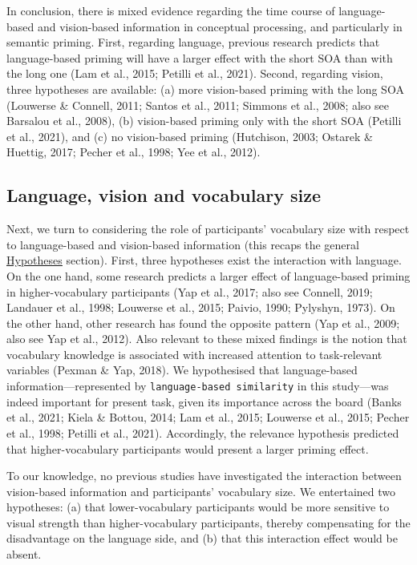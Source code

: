 \documentclass[
  12pt,
  man,floatsintext]{apa7}
\begin{document}
In conclusion, there is mixed evidence regarding the time course of language-based and vision-based information in conceptual processing, and particularly in semantic priming. First, regarding language, previous research predicts that language-based priming will have a larger effect with the short SOA than with the long one (Lam et al., 2015; Petilli et al., 2021). Second, regarding vision, three hypotheses are available: (a) more vision-based priming with the long SOA (Louwerse \& Connell, 2011; Santos et al., 2011; Simmons et al., 2008; also see Barsalou et al., 2008), (b) vision-based priming only with the short SOA (Petilli et al., 2021), and (c) no vision-based priming (Hutchison, 2003; Ostarek \& Huettig, 2017; Pecher et al., 1998; Yee et al., 2012).

\hypertarget{language-vision-and-vocabulary-size}{%
\subsection{Language, vision and vocabulary size}\label{language-vision-and-vocabulary-size}}

Next, we turn to considering the role of participants' vocabulary size with respect to language-based and vision-based information (this recaps the general \protect\hyperlink{hypotheses}{\underline{Hypotheses}} section). First, three hypotheses exist the interaction with language. On the one hand, some research predicts a larger effect of language-based priming in higher-vocabulary participants (Yap et al., 2017; also see Connell, 2019; Landauer et al., 1998; Louwerse et al., 2015; Paivio, 1990; Pylyshyn, 1973). On the other hand, other research has found the opposite pattern (Yap et al., 2009; also see Yap et al., 2012). Also relevant to these mixed findings is the notion that vocabulary knowledge is associated with increased attention to task-relevant variables (Pexman \& Yap, 2018). We hypothesised that language-based information---represented by \texttt{language-based\ similarity} in this study---was indeed important for present task, given its importance across the board (Banks et al., 2021; Kiela \& Bottou, 2014; Lam et al., 2015; Louwerse et al., 2015; Pecher et al., 1998; Petilli et al., 2021). Accordingly, the relevance hypothesis predicted that higher-vocabulary participants would present a larger priming effect.

To our knowledge, no previous studies have investigated the interaction between vision-based information and participants' vocabulary size. We entertained two hypotheses: (a) that lower-vocabulary participants would be more sensitive to visual strength than higher-vocabulary participants, thereby compensating for the disadvantage on the language side, and (b) that this interaction effect would be absent.
\end{document}
